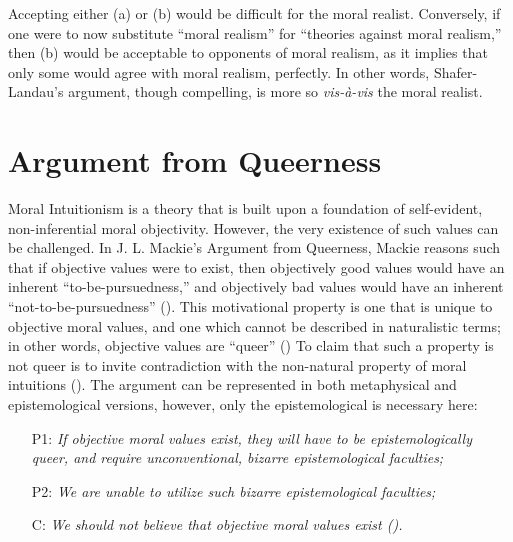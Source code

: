 \documentclass[12pt, a4paper, twoside]{article}
\begin{document}
Accepting either (a) or (b) would be difficult for the moral realist. Conversely, if one were to now substitute “moral realism” for “theories against moral realism,” then (b) would be acceptable to opponents of moral realism, as it implies that only some would agree with moral realism, perfectly. In other words, Shafer-Landau’s argument, though compelling, is more so \emph{vis-à-vis} the moral realist. 

\section{Argument from Queerness}

Moral Intuitionism is a theory that is built upon a foundation of self-evident, non-inferential moral objectivity. However, the very existence of such values can be challenged. In J. L. Mackie’s Argument from Queerness, Mackie reasons such that if objective values were to exist, then objectively good values would have an inherent “to-be-pursuedness,” and objectively bad values would have an inherent “not-to-be-pursuedness” (\cites[p.\ 40]{mackie1978ethics}[p.\ 104]{olson2014moral}). This motivational property is one that is unique to objective moral values, and one which cannot be described in naturalistic terms; in other words, objective values are “queer” (\cites[pp.\ 2–3]{scholl2015defense}[p.\ 33]{mackie1978ethics}) To claim that such a property is not queer is to invite contradiction with the non-natural property of moral intuitions (\cite[p.\ 41]{mackie1978ethics}). The argument can be represented in both metaphysical and epistemological versions, however, only the epistemological is necessary here:  

\begin{enumerate}

	\item[P1:] \textit{If objective moral values exist, they will have to be epistemologically queer, and require unconventional, bizarre epistemological faculties;}

	\item[P2:] \textit{We are unable to utilize such bizarre epistemological faculties;}

	\item[C:] \textit{We should not believe that objective moral values exist (\cites[pp.\ 38–41]{mackie1978ethics}[pp.\ 1–2]{lillehammer2019queerness}).}

\end{enumerate}
\end{document}
